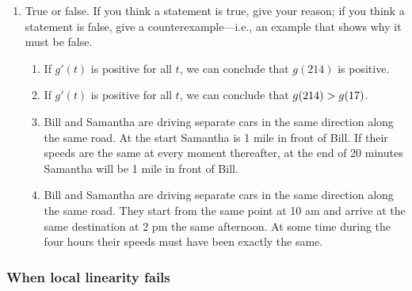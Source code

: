 \begin{enumerate}
\begin{enumerate}
\end{enumerate}
\item True or false.  If you think a statement is true, give your
reason; if you think a statement is false, give a
counterexample---i.e., an example that shows why it must be false.

  \begin{enumerate}
  \item If $g'(t)$ is positive for all $t$, we can conclude that $g(214)$
is positive.

  \item If $g'(t)$ is positive for all $t$, we can conclude that $g(214)
>g(17)\/$.

  \item Bill and Samantha are driving separate cars in the same direction
along the same road.  At the start Samantha is 1 mile in front of
Bill.  If their speeds are the same at every moment thereafter, at the
end of 20 minutes Samantha will be 1 mile in front of Bill.

  \item Bill and Samantha are driving separate cars in the same direction
along the same road.  They start from the same point at 10 am and
arrive at the same destination at 2 pm the same afternoon.  At some
time during the four hours their speeds must have been exactly the
same.


\end{enumerate}
\end{enumerate}
\subsubsection{When local linearity fails}
\label{subsubsec:when-local-linearity-fails}




